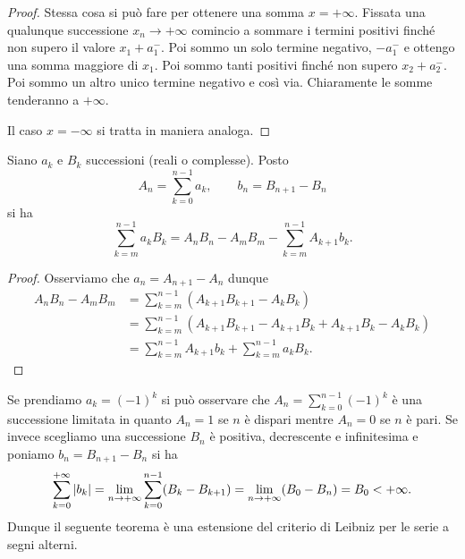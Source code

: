 \begin{proof}
Stessa cosa si può fare per ottenere una somma $x=+\infty$. Fissata una qualunque
successione $x_n \to +\infty$ comincio a sommare i termini positivi finché non supero il valore $x_1+a_1^-$. Poi sommo un solo termine negativo, $-a_1^-$ e ottengo una somma maggiore di $x_1$. Poi sommo tanti positivi finché non supero $x_2+a_2^-$. Poi sommo un altro unico termine negativo e così via. Chiaramente le somme tenderanno a $+\infty$.

Il caso $x=-\infty$ si tratta in maniera analoga.
\end{proof}

\begin{theorem}
\label{th:somma_per_parti}%
Siano $a_k$ e $B_k$ successioni (reali o complesse).
Posto
\[
  A_n = \sum_{k=0}^{n-1} a_k, \qquad
  b_n = B_{n+1} - B_n
\]
si ha
%
\begin{equation}\label{eq:somma_per_parti}
 \sum_{k=m}^{n-1} a_k B_k = A_n B_n - A_m B_m - \sum_{k=m}^{n-1} A_{k+1}b_k.
\end{equation}
\end{theorem}
%
\begin{proof}
Osserviamo che $a_n = A_{n+1}-A_n$ dunque
\begin{align*}
  A_n B_n - A_m B_m
  &= \sum_{k=m}^{n-1} (A_{k+1}B_{k+1}-A_k B_k)\\
  &= \sum_{k=m}^{n-1} (A_{k+1}B_{k+1}-A_{k+1}B_k + A_{k+1}B_k - A_k B_k)\\
  &= \sum_{k=m}^{n-1} A_{k+1}b_k + \sum_{k=m}^{n-1} a_k B_k.
\end{align*}
\end{proof}

Se prendiamo $a_k=(-1)^k$ si può osservare che $A_n = \sum_{k=0}^{n-1} (-1)^k$
è una successione limitata in quanto $A_n = 1$ se $n$ è dispari mentre
$A_n=0$ se $n$ è pari.
Se invece scegliamo una successione $B_n$ è positiva,
decrescente e infinitesima
e poniamo $b_n = B_{n+1}-B_n$
si ha
\[
  \sum_{k=0}^{+\infty} {\left|b_k\right|}
  = \lim_{n\to+\infty}\sum_{k=0}^{n-1} (B_k-B_{k+1})
  = \lim_{n\to +\infty} (B_0 - B_n) = B_0 < +\infty.
\]
Dunque il seguente teorema è una estensione del criterio
di Leibniz per le serie a segni alterni.

